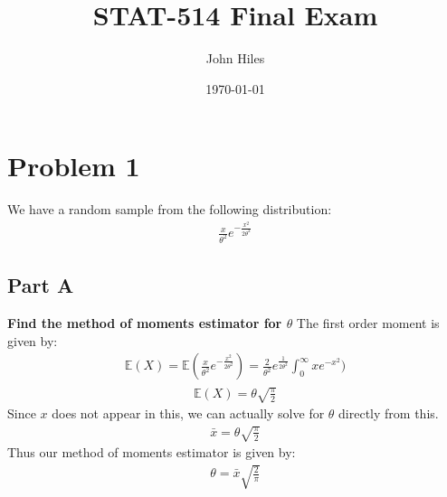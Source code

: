 \documentclass{article}
\title{STAT-514 Final Exam}
\author{John Hiles}
\date\today
\begin{document}
\maketitle %


\section*{Problem 1}
We have a random sample from the following distribution:
\begin{align*}
\frac{x}{\theta^2} e^{-\frac{x^2}{2\theta^2}}
\end{align*}
\subsection*{Part A}
\textbf{Find the method of moments estimator for $\theta$}
The first order moment is given by:
\begin{align*}
\mathbb{E}(X) = \mathbb{E}(\frac{x}{\theta^2} e^{-\frac{x^2}{2\theta^2}}) = \frac{2}{\theta^2} e^{\frac{1}{2\theta^2}} \int_{0}^{\infty} x e^{-x^2})
\end{align*}
\begin{align*}
\mathbb{E}(X) = \theta \sqrt{\frac{\pi}{2}}
\end{align*}
Since $x$ does not appear in this, we can actually solve for $\theta$ directly from this.
\begin{align*}
\bar{x} = \theta \sqrt{\frac{\pi}{2}} 
\end{align*}
Thus our method of moments estimator is given by:
\begin{align*}
\boxed{ \theta = \bar{x}\sqrt{\frac{2}{\pi}} }
\end{align*}
\end{document}
